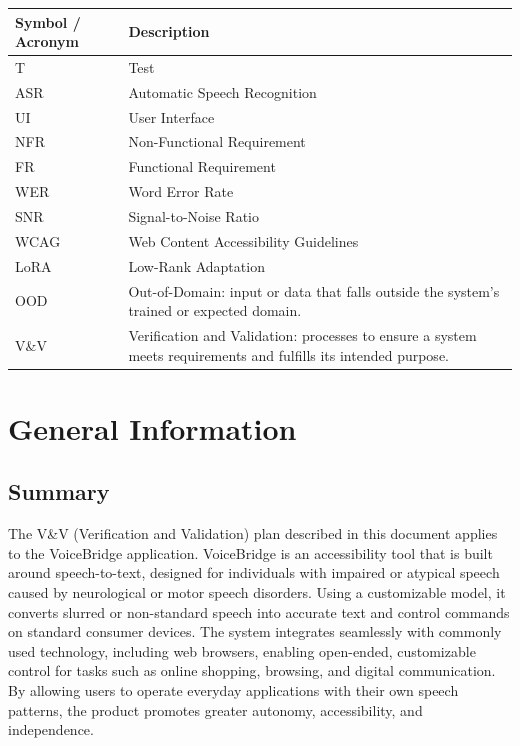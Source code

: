 \documentclass[12pt, titlepage]{article}
\begin{document}
\renewcommand{\arraystretch}{1.2}
\begin{tabular}{@{} l p{} @{}}
  \toprule
  \textbf{Symbol / Acronym} & \textbf{Description}\\
  \midrule
  T & Test\\
  ASR & Automatic Speech Recognition\\
  UI & User Interface\\
  NFR & Non-Functional Requirement\\
  FR & Functional Requirement\\
  WER & Word Error Rate\\
  SNR & Signal-to-Noise Ratio\\
  WCAG & Web Content Accessibility Guidelines\\
  LoRA & Low-Rank Adaptation\\
  OOD & Out-of-Domain: input or data that falls outside the system's trained or expected domain.\\
  V\&V & Verification and Validation: processes to ensure a system meets requirements and fulfills its intended purpose.\\
  \bottomrule
\end{tabular}

\newpage




\section{General Information}

\subsection{Summary}

The V\&V (Verification and Validation) plan described in this document applies to the VoiceBridge application. VoiceBridge is an accessibility tool that is built around speech-to-text, designed for individuals with impaired or atypical speech caused by neurological or motor speech disorders. Using a customizable model, it converts slurred or non-standard speech into accurate text and control commands on standard consumer devices. The system integrates seamlessly with commonly used technology, including web browsers, enabling open-ended, customizable control for tasks such as online shopping, browsing, and digital communication. By allowing users to operate everyday applications with their own speech patterns, the product promotes greater autonomy, accessibility, and independence.
\end{document}
